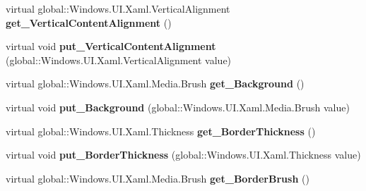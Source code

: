 \begin{DoxyCompactItemize}
\mbox{\label{class_windows_1_1_u_i_1_1_xaml_1_1_controls_1_1_control_a7006e185e4500ff498f82b3f44fd79fa}} 
virtual global\+::\+Windows.\+U\+I.\+Xaml.\+Vertical\+Alignment {\bfseries get\+\_\+\+Vertical\+Content\+Alignment} ()
\item 
\mbox{\label{class_windows_1_1_u_i_1_1_xaml_1_1_controls_1_1_control_af756ef0a995189ff771e3537a5391b42}} 
virtual void {\bfseries put\+\_\+\+Vertical\+Content\+Alignment} (global\+::\+Windows.\+U\+I.\+Xaml.\+Vertical\+Alignment value)
\item 
\mbox{\label{class_windows_1_1_u_i_1_1_xaml_1_1_controls_1_1_control_a5eb22428eb30c926bcbbdcce65e09678}} 
virtual global\+::\+Windows.\+U\+I.\+Xaml.\+Media.\+Brush {\bfseries get\+\_\+\+Background} ()
\item 
\mbox{\label{class_windows_1_1_u_i_1_1_xaml_1_1_controls_1_1_control_abc00b1110cfb2ca8076ac8356a548d78}} 
virtual void {\bfseries put\+\_\+\+Background} (global\+::\+Windows.\+U\+I.\+Xaml.\+Media.\+Brush value)
\item 
\mbox{\label{class_windows_1_1_u_i_1_1_xaml_1_1_controls_1_1_control_ab76eb28c6756bacca0cc41591940408d}} 
virtual global\+::\+Windows.\+U\+I.\+Xaml.\+Thickness {\bfseries get\+\_\+\+Border\+Thickness} ()
\item 
\mbox{\label{class_windows_1_1_u_i_1_1_xaml_1_1_controls_1_1_control_a4a02a62301b0458bfefc9d7c25b6511e}} 
virtual void {\bfseries put\+\_\+\+Border\+Thickness} (global\+::\+Windows.\+U\+I.\+Xaml.\+Thickness value)
\item 
\mbox{\label{class_windows_1_1_u_i_1_1_xaml_1_1_controls_1_1_control_a71ff5e84affd65e6419e6e3f9a2292b9}} 
virtual global\+::\+Windows.\+U\+I.\+Xaml.\+Media.\+Brush {\bfseries get\+\_\+\+Border\+Brush} ()
\item 
\mbox{\label{class_windows_1_1_u_i_1_1_xaml_1_1_controls_1_1_control_a551a318818f8d5853d61b020af44db11}} 

\end{DoxyCompactItemize}
